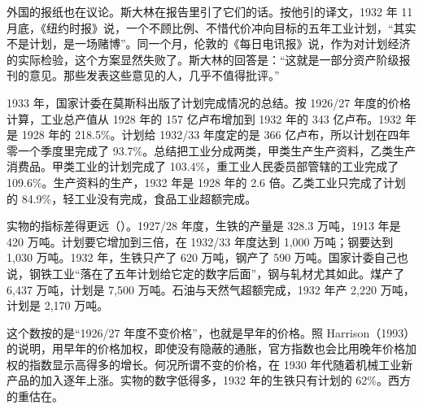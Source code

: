 外国的报纸也在议论。斯大林在报告里引了它们的话。按他引的译文，1932 年 11 月底，《纽约时报》说，一个不顾比例、不惜代价冲向目标的五年工业计划，“其实不是计划，是一场赌博”\cite{stalin1933}。同一个月，伦敦的《每日电讯报》说，作为对计划经济的实际检验，这个方案显然失败了\cite{stalin1933}。斯大林的回答是：“这就是一部分资产阶级报刊的意见。那些发表这些意见的人，几乎不值得批评。”\cite{stalin1933}

1933 年，国家计委在莫斯科出版了计划完成情况的总结\cite{gosplan1933}。按 1926/27 年度的价格计算，工业总产值从 1928 年的 157 亿卢布增加到 1932 年的 343 亿卢布\cite{gosplan1933}。1932 年是 1928 年的 218.5\%\cite{gosplan1933}。计划给 1932/33 年度定的是 366 亿卢布，所以计划在四年零一个季度里完成了 93.7\%\cite{gosplan1933}。总结把工业分成两类，甲类生产生产资料，乙类生产消费品\cite{gosplan1933}。甲类工业的计划完成了 103.4\%，重工业人民委员部管辖的工业完成了 109.6\%\cite{gosplan1933}。生产资料的生产，1932 年是 1928 年的 2.6 倍\cite{gosplan1933}。乙类工业只完成了计划的 84.9\%，轻工业没有完成，食品工业超额完成\cite{gosplan1933}。


实物的指标差得更远（）。1927/28 年度，生铁的产量是 328.3 万吨，1913 年是 420 万吨\cite{gosplan1933}。计划要它增加到三倍，在 1932/33 年度达到 1,000 万吨；钢要达到 1,030 万吨\cite{gosplan1933}。1932 年，生铁只产了 620 万吨，钢产了 590 万吨\cite{gosplan1933}。国家计委自己也说，钢铁工业“落在了五年计划给它定的数字后面”，钢与轧材尤其如此\cite{gosplan1933}。煤产了 6,437 万吨，计划是 7,500 万吨\cite{gosplan1933}。石油与天然气超额完成，1932 年产 2,220 万吨，计划是 2,170 万吨\cite{gosplan1933}。

\begin{pitfall}
这个数按的是“1926/27 年度不变价格”，也就是早年的价格。照 Harrison（1993）的说明，用早年的价格加权，即使没有隐蔽的通胀，官方指数也会比用晚年价格加权的指数显示高得多的增长\cite{harrison1993}。何况所谓不变的价格，在 1930 年代随着机械工业新产品的加入逐年上涨\cite{harrison1993}。实物的数字低得多，1932 年的生铁只有计划的 62\%\cite{gosplan1933}。西方的重估在。
\end{pitfall}

